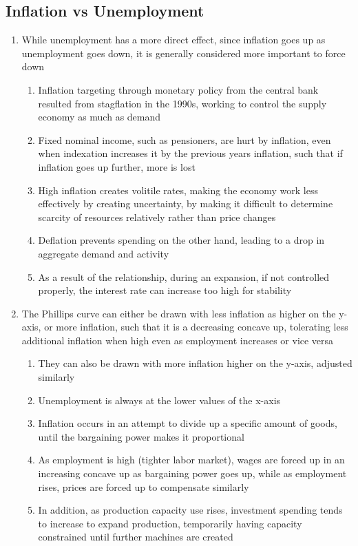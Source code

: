 \documentclass[11 pt, twoside]{article}
\begin{document}
\subsection{Inflation vs Unemployment}
\begin{enumerate}
\item While unemployment has a more direct effect, since inflation goes up as unemployment goes down, it is generally considered more important to force down
\begin{enumerate}
\item Inflation targeting through monetary policy from the central bank resulted from stagflation in the 1990s, working to control the supply economy as much as demand
\item Fixed nominal income, such as pensioners, are hurt by inflation, even when indexation increases it by the previous years inflation, such that if inflation goes up further, more is lost
\item High inflation creates volitile rates, making the economy work less effectively by creating uncertainty, by making it difficult to determine scarcity of resources relatively rather than price changes
\item Deflation prevents spending on the other hand, leading to a drop in aggregate demand and activity
\item As a result of the relationship, during an expansion, if not controlled properly, the interest rate can increase too high for stability
\end{enumerate}
\item The Phillips curve can either be drawn with less inflation as higher on the y-axis, or more inflation, such that it is a decreasing concave up, tolerating less additional inflation when high even as employment increases or vice versa
\begin{enumerate}
\item They can also be drawn with more inflation higher on the y-axis, adjusted similarly
\item Unemployment is always at the lower values of the x-axis
\item Inflation occurs in an attempt to divide up a specific amount of goods, until the bargaining power makes it proportional
\item As employment is high (tighter labor market), wages are forced up in an increasing concave up as bargaining power goes up, while as employment rises, prices are forced up to compensate similarly
\item In addition, as production capacity use rises, investment spending tends to increase to expand production, temporarily having capacity constrained until further machines are created

\end{enumerate}
\end{enumerate}
\end{document}
